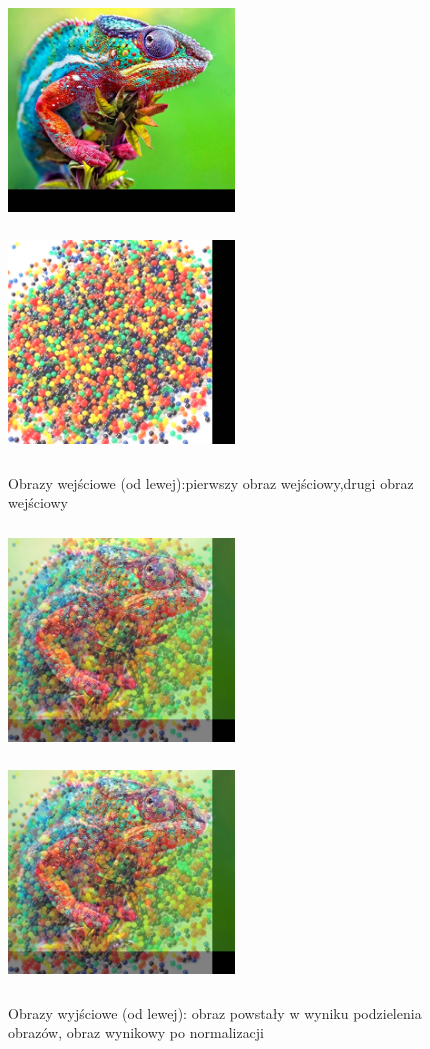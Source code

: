 \documentclass[magisterska,openany]{pracadypl}
\begin{document}
\newpage
\begin{figure}[h]
\centering
\includegraphics[width=6cm, height=6cm]{2_4/ResolRGB3.jpg}
\includegraphics[width=6cm, height=6cm]{2_4/ResolRGB4.jpg}
\caption{Obrazy wejściowe (od lewej):pierwszy obraz wejściowy,drugi obraz wejściowy}
\end{figure}
\begin{figure}[h]
\centering
\includegraphics[width=6cm, height=6cm]{4_8/divtwoRGB2.jpg}
\includegraphics[width=6cm, height=6cm]{4_8/ndivtwoRGB2.jpg}
\caption{Obrazy wyjściowe (od lewej): obraz powstały w wyniku
podzielenia obrazów, obraz wynikowy po normalizacji}
\end{figure}
\end{document}
